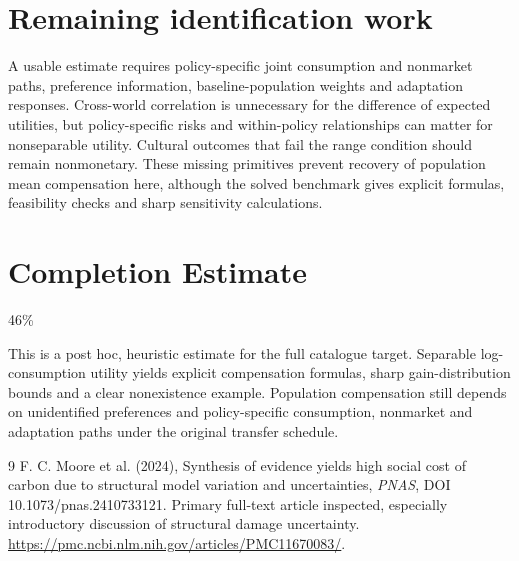 \documentclass[11pt]{article}
\begin{document}
\section*{Remaining identification work}
A usable estimate requires policy-specific joint consumption and nonmarket paths, preference information, baseline-population weights and adaptation responses. Cross-world correlation is unnecessary for the difference of expected utilities, but policy-specific risks and within-policy relationships can matter for nonseparable utility. Cultural outcomes that fail the range condition should remain nonmonetary. These missing primitives prevent recovery of population mean compensation here, although the solved benchmark gives explicit formulas, feasibility checks and sharp sensitivity calculations.

\section{Completion Estimate}
46\%

This is a post hoc, heuristic estimate for the full catalogue target.
Separable log-consumption utility yields explicit compensation formulas, sharp gain-distribution bounds and a clear nonexistence example. Population compensation still depends on unidentified preferences and policy-specific consumption, nonmarket and adaptation paths under the original transfer schedule.

\begin{thebibliography}{9}
 F. C. Moore et al. (2024), Synthesis of evidence yields high social cost of carbon due to structural model variation and uncertainties, \emph{PNAS}, DOI 10.1073/pnas.2410733121. Primary full-text article inspected, especially introductory discussion of structural damage uncertainty. \url{https://pmc.ncbi.nlm.nih.gov/articles/PMC11670083/}.
\end{thebibliography}
\end{document}
